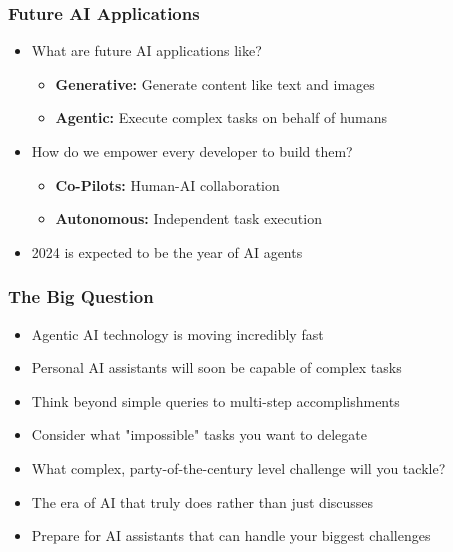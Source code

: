 \begin{frame}[fragile]\frametitle{Future AI Applications}
\begin{itemize}
    \item What are future AI applications like?
    \begin{itemize}
        \item \textbf{Generative:} Generate content like text and images
        \item \textbf{Agentic:} Execute complex tasks on behalf of humans
    \end{itemize}
    \item How do we empower every developer to build them?
    \begin{itemize}
        \item \textbf{Co-Pilots:} Human-AI collaboration
        \item \textbf{Autonomous:} Independent task execution
    \end{itemize}
    \item 2024 is expected to be the year of AI agents
\end{itemize}
\end{frame}

\begin{frame}[fragile]\frametitle{The Big Question}
      \begin{itemize}
        \item Agentic AI technology is moving incredibly fast
        \item Personal AI assistants will soon be capable of complex tasks
        \item Think beyond simple queries to multi-step accomplishments
        \item Consider what "impossible" tasks you want to delegate
        \item What complex, party-of-the-century level challenge will you tackle?
        \item The era of AI that truly does rather than just discusses
        \item Prepare for AI assistants that can handle your biggest challenges
      \end{itemize}
\end{frame}


